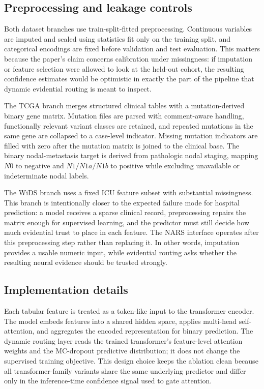 \documentclass{article}
\begin{document}
\subsection{Preprocessing and leakage controls}

Both dataset branches use train-split-fitted preprocessing. Continuous variables are imputed and scaled using statistics fit only on the training split, and categorical encodings are fixed before validation and test evaluation. This matters because the paper's claim concerns calibration under missingness: if imputation or feature selection were allowed to look at the held-out cohort, the resulting confidence estimates would be optimistic in exactly the part of the pipeline that dynamic evidential routing is meant to inspect.

The TCGA branch merges structured clinical tables with a mutation-derived binary gene matrix. Mutation files are parsed with comment-aware handling, functionally relevant variant classes are retained, and repeated mutations in the same gene are collapsed to a case-level indicator. Missing mutation indicators are filled with zero after the mutation matrix is joined to the clinical base. The binary nodal-metastasis target is derived from pathologic nodal staging, mapping $N0$ to negative and $N1/N1a/N1b$ to positive while excluding unavailable or indeterminate nodal labels.

The WiDS branch uses a fixed ICU feature subset with substantial missingness. This branch is intentionally closer to the expected failure mode for hospital prediction: a model receives a sparse clinical record, preprocessing repairs the matrix enough for supervised learning, and the predictor must still decide how much evidential trust to place in each feature. The NARS interface operates after this preprocessing step rather than replacing it. In other words, imputation provides a usable numeric input, while evidential routing asks whether the resulting neural evidence should be trusted strongly.

\subsection{Implementation details}

Each tabular feature is treated as a token-like input to the transformer encoder. The model embeds features into a shared hidden space, applies multi-head self-attention, and aggregates the encoded representation for binary prediction. The dynamic routing layer reads the trained transformer's feature-level attention weights and the MC-dropout predictive distribution; it does not change the supervised training objective. This design choice keeps the ablation clean because all transformer-family variants share the same underlying predictor and differ only in the inference-time confidence signal used to gate attention.
\end{document}
